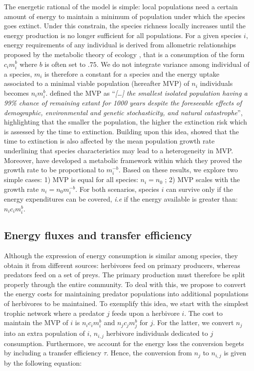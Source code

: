 The energetic rational of the model is simple: local populations need a
certain amount of energy to maintain a minimum of population under which
the species goes extinct. Under this constrain, the species richness
locally increases until the energy production is no longer sufficient
for all populations. For a given species \(i\), energy requirements of
any individual is derived from allometric relationships proposed by the
metabolic theory of ecology \citep{Brown2004}, that is a consumption of
the form \(c_im_i^b\) where \(b\) is often set to \(.75\). We do not
integrate variance among individual of a species, \(m_i\) is therefore a
constant for a species and the energy uptake associated to a minimal
viable population (hereafter MVP) of \(n_i\) individuals becomes
\(n_im_i^b\). \citet{Shaffer1981} defined the MVP as
``\emph{{[}\ldots{}{]} the smallest isolated population having a 99\%
chance of remaining extant for 1000 years despite the foreseeable
effects of demographic, environmental and genetic stochasticity, and
natural catastrophe}'', highlighting that the smaller the population,
the higher the extinction risk which is assessed by the time to
extinction. Building upon this idea, \citet{Lande1993} showed that the
time to extinction is also affected by the mean population growth rate
underlining that species characteristics may lead to a heterogeneity in
MVP. Moreover, \citet{Savage2004} have developed a metabolic framework
within which they proved the growth rate to be proportional to
\(m_i^{-b}\). Based on these results, we explore two simple cases: 1)
MVP is equal for all species: \(n_i=n_0\) ; 2) MVP scales with the
growth rate \(n_i=n_0m_i^{-b}\). For both scenarios, species \(i\) can
survive only if the energy expenditures can be covered, \emph{i.e} if
the energy available is greater than: \(n_ic_im_i^b\).

\subsection{Energy fluxes and transfer
efficiency}\label{energy-fluxes-and-transfer-efficiency}

Although the expression of energy consumption is similar among species,
they obtain it from different sources: herbivores feed on primary
producers, whereas predators feed on a set of preys. The primary
production must therefore be split properly through the entire
community. To deal with this, we propose to convert the energy costs for
maintaining predator populations into additional populations of
herbivores to be maintained. To exemplify this idea, we start with the
simplest trophic network where a predator \(j\) feeds upon a herbivore
\(i\). The cost to maintain the MVP of \(i\) is \(n_ic_im_i^b\) and
\(n_jc_jm_j^b\) for \(j\). For the latter, we convert \(n_j\) into an
extra population of \(i\), \(n_{i,j}\) herbivore individuals dedicated
to \(j\) consumption. Furthermore, we account for the energy loss the
conversion begets by including a transfer efficiency \(\tau\). Hence,
the conversion from \(n_{j}\) to \(n_{i,j}\) is given by the following
equation:


